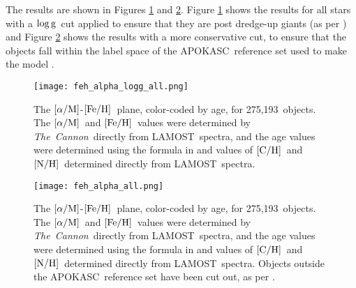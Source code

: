 \documentclass[12pt, preprint]{aastex}
\newcommand{\tc}{\textsl{The~Cannon}}
\newcommand{\apogee}{APOGEE}
\newcommand{\lamost}{LAMOST}
\newcommand{\apokasc}{APOKASC}
\newcommand{\logg}{\mbox{$\rm \log g$}}
\newcommand{\mh}{\mbox{$\rm [M/H]$}}
\newcommand{\feh}{\mbox{$\rm [Fe/H]$}}
\newcommand{\alpham}{\mbox{$\rm [\alpha/M]$}}
\newcommand{\carbon}{\mbox{$\rm [C/H]$}}
\newcommand{\nitrogen}{\mbox{$\rm [N/H]$}}
\newcommand{\ntestobj}{275,193}
\begin{document}
The results are shown in Figures \ref{fig:feh-alpha-logg}
and \ref{fig:feh-alpha}. 
Figure \ref{fig:feh-alpha-logg} shows the results
for all stars with a \logg\ cut applied to ensure that they
are post dredge-up giants (as per \citet{Martig2016})
and Figure \ref{fig:feh-alpha} shows the results with
a more conservative cut, to ensure that the objects
fall within the label space of the \apokasc\ reference set
used to make the model \citep{Martig2016}. 

\begin{figure}[ht!]
\centering
\texttt{[image: feh\_alpha\_logg\_all.png]}
\caption{
The \alpham-\feh\ plane, color-coded by age, 
for \ntestobj\ objects. The \alpham\ and \feh\ values
were determined by \tc\ directly from \lamost\ spectra,
and the age values were determined using the formula
in \citet{Martig2016} and values of \carbon\ and \nitrogen\ 
determined directly from \lamost\ spectra.
}
\label{fig:feh-alpha-logg}
\end{figure}

\begin{figure}[ht!]
\centering
\texttt{[image: feh\_alpha\_all.png]}
\caption{
The \alpham-\feh\ plane, color-coded by age, 
for \ntestobj\ objects. The \alpham\ and \feh\ values
were determined by \tc\ directly from \lamost\ spectra,
and the age values were determined using the formula
in \citet{Martig2016} and values of \carbon\ and \nitrogen\ 
determined directly from \lamost\ spectra.
Objects outside the \apokasc\ reference set
have been cut out, as per \citet{Martig2016}.
}
\label{fig:feh-alpha}
\end{figure}



\end{document}
